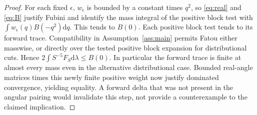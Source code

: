 \documentclass[11pt,a4paper]{article}
\theoremstyle{definition}
\theoremstyle{remark}
\newcommand{\dS}{\mathrm{d}}
\begin{document}
\begin{proof}
For each fixed $\epsilon$, $w_\epsilon$ is bounded by a constant times $q^2$, so \eqref{eq:real} and \eqref{eq:B} justify Fubini and identify the mass integral of the positive block test with $\int w_\epsilon(q)B(-q^2)\dS q$. This tends to $B(0)$. Each positive block test tends to its forward trace. Compatibility in Assumption~\ref{ass:main} permits Fatou either masswise, or directly over the tested positive block expansion for distributional cuts. Hence $2\int S^{-5}F_S\dS\lambda\le B(0)$. In particular the forward trace is finite at almost every mass even in the alternative distributional case. Bounded real-angle matrices times this newly finite positive weight now justify dominated convergence, yielding equality. A forward delta that was not present in the angular pairing would invalidate this step, not provide a counterexample to the claimed implication.
\end{proof}
\end{document}
